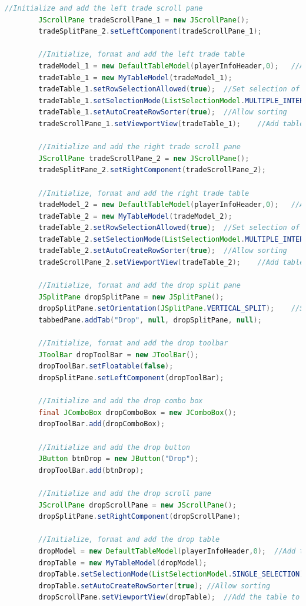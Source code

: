 \documentclass[12pt]{report}
\begin{document}
\begin{singlespace}
\begin{lstlisting}[language=Java,label=some-code,caption={GUI.java}]
		//Initialize and add the left trade scroll pane
		JScrollPane tradeScrollPane_1 = new JScrollPane();
		tradeSplitPane_2.setLeftComponent(tradeScrollPane_1);
		
		//Initialize, format and add the left trade table
		tradeModel_1 = new DefaultTableModel(playerInfoHeader,0);	//Add the header but no rows
		tradeTable_1 = new MyTableModel(tradeModel_1);
		tradeTable_1.setRowSelectionAllowed(true);	//Set selection of entire rows
		tradeTable_1.setSelectionMode(ListSelectionModel.MULTIPLE_INTERVAL_SELECTION);	//Allow multiple row selection
		tradeTable_1.setAutoCreateRowSorter(true);	//Allow sorting
		tradeScrollPane_1.setViewportView(tradeTable_1);	//Add table to scroll pane
		
		//Initialize and add the right trade scroll pane
		JScrollPane tradeScrollPane_2 = new JScrollPane();
		tradeSplitPane_2.setRightComponent(tradeScrollPane_2);
		
		//Initialize, format and add the right trade table
		tradeModel_2 = new DefaultTableModel(playerInfoHeader,0);	//Add the header but no rows
		tradeTable_2 = new MyTableModel(tradeModel_2);
		tradeTable_2.setRowSelectionAllowed(true);	//Set selection of entire rows
		tradeTable_2.setSelectionMode(ListSelectionModel.MULTIPLE_INTERVAL_SELECTION);	//Allow multiple row selection
		tradeTable_2.setAutoCreateRowSorter(true);	//Allow sorting
		tradeScrollPane_2.setViewportView(tradeTable_2);	//Add table to scroll pane
		
		//Initialize, format and add the drop split pane
		JSplitPane dropSplitPane = new JSplitPane();
		dropSplitPane.setOrientation(JSplitPane.VERTICAL_SPLIT);	//Split vertically
		tabbedPane.addTab("Drop", null, dropSplitPane, null);
		
		//Initialize, format and add the drop toolbar
		JToolBar dropToolBar = new JToolBar();
		dropToolBar.setFloatable(false);
		dropSplitPane.setLeftComponent(dropToolBar);
		
		//Initialize and add the drop combo box
		final JComboBox dropComboBox = new JComboBox();
		dropToolBar.add(dropComboBox);
		
		//Initialize and add the drop button
		JButton btnDrop = new JButton("Drop");
		dropToolBar.add(btnDrop);
		
		//Initialize and add the drop scroll pane
		JScrollPane dropScrollPane = new JScrollPane();
		dropSplitPane.setRightComponent(dropScrollPane);
		
		//Initialize, format and add the drop table
		dropModel = new DefaultTableModel(playerInfoHeader,0);	//Add the header but no rows
		dropTable = new MyTableModel(dropModel);
		dropTable.setSelectionMode(ListSelectionModel.SINGLE_SELECTION);	//Alow single selection
		dropTable.setAutoCreateRowSorter(true);	//Allow sorting
		dropScrollPane.setViewportView(dropTable);	//Add the table to the scroll pane
		

\end{lstlisting}
\end{singlespace}
\end{document}
